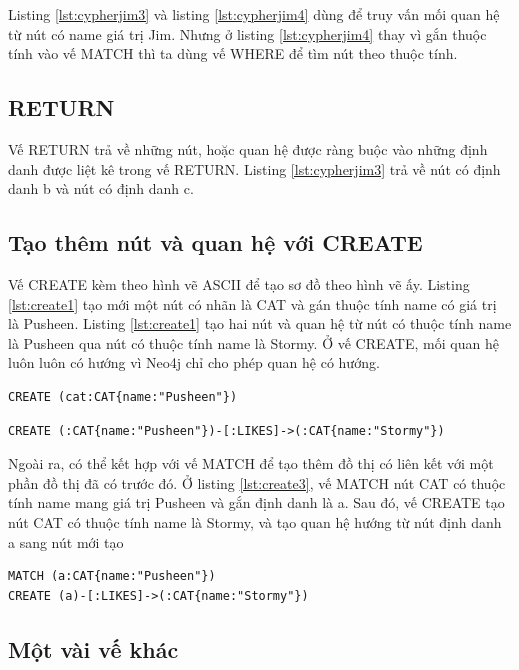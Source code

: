 Listing \ref{lst:cypherjim3} và listing \ref{lst:cypherjim4} dùng để truy vấn mối quan hệ từ nút có name giá trị Jim. Nhưng ở listing \ref{lst:cypherjim4} thay vì gắn thuộc tính vào vế MATCH thì ta dùng vế WHERE để tìm nút theo thuộc tính.   

\subsection{RETURN}
Vế RETURN trả về những nút, hoặc quan hệ được ràng buộc vào những định danh được liệt kê trong vế RETURN. Listing \ref{lst:cypherjim3} trả về nút có định danh b và nút có định danh c. 

\subsection{Tạo thêm nút và quan hệ với CREATE}
Vế CREATE kèm theo hình vẽ ASCII để tạo sơ đồ theo hình vẽ ấy. Listing \ref{lst:create1} tạo mới một nút có nhãn là CAT và gán thuộc tính name có giá trị là Pusheen. Listing \ref{lst:create1} tạo hai nút và quan hệ từ nút có thuộc tính name là Pusheen qua nút có thuộc tính name là Stormy. Ở vế CREATE, mối quan hệ luôn luôn có hướng vì Neo4j chỉ cho phép quan hệ có hướng.

\begin{lstlisting}[caption={Cypher tạo mới nút}, label={lst:create1}]
CREATE (cat:CAT{name:"Pusheen"})
\end{lstlisting}

\begin{lstlisting}[caption={Cypher tạo mới hai nút và quan hệ giữa hai nút}, label={lst:create2}]
CREATE (:CAT{name:"Pusheen"})-[:LIKES]->(:CAT{name:"Stormy"})
\end{lstlisting}

Ngoài ra, có thể kết hợp với vế MATCH để tạo thêm đồ thị có liên kết với một phần đồ thị đã có trước đó. 
Ở listing \ref{lst:create3}, vế MATCH nút CAT có thuộc tính name mang giá trị Pusheen và gắn định danh là a. Sau đó, vế CREATE tạo nút CAT có thuộc tính name là Stormy, và tạo quan hệ hướng từ nút định danh a sang nút mới tạo 

\begin{lstlisting}[caption={Cypher tạo nút và quan hệ nối với nút có sẵn}, label={lst:create3}]
MATCH (a:CAT{name:"Pusheen"})
CREATE (a)-[:LIKES]->(:CAT{name:"Stormy"})
\end{lstlisting}


\subsection{Một vài vế khác}

